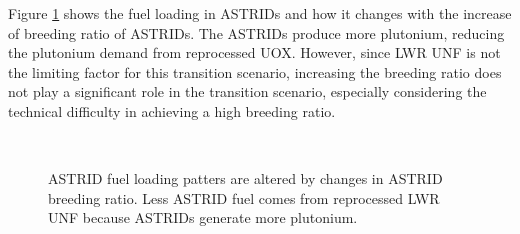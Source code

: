 Figure \ref{fig:br_fuel} shows the fuel loading in \glspl{ASTRID}
and how it changes with the increase of breeding ratio of \glspl{ASTRID}.
The \glspl{ASTRID} produce 
more plutonium, reducing the plutonium demand from 
reprocessed \gls{UOX}. However, since \gls{LWR} \gls{UNF} is not
the limiting factor for this transition scenario,
increasing the breeding ratio does not play a significant
role in the transition scenario, especially considering the technical difficulty
in achieving a high breeding ratio.

\begin{figure}[!ht]
	\centering
	\quad
	\\
	\quad
	\caption{\gls{ASTRID} fuel loading patters are altered by changes in \gls{ASTRID} 
		breeding ratio. Less \gls{ASTRID} fuel comes from reprocessed \gls{LWR} \gls{UNF}
		because \glspl{ASTRID} generate more plutonium.}
	\label{fig:br_fuel}
\end{figure}

